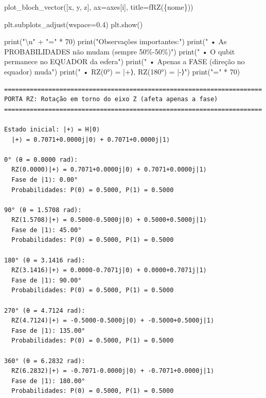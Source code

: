 \documentclass[
  brazilian,
]{report}
\newenvironment{Shaded}{\begin{snugshade}}{\end{snugshade}}
\newcommand{\BuiltInTok}[1]{\textcolor[rgb]{0.00,0.23,0.31}{#1}}
\newcommand{\CharTok}[1]{\textcolor[rgb]{0.13,0.47,0.30}{#1}}
\newcommand{\DecValTok}[1]{\textcolor[rgb]{0.68,0.00,0.00}{#1}}
\newcommand{\FloatTok}[1]{\textcolor[rgb]{0.68,0.00,0.00}{#1}}
\newcommand{\NormalTok}[1]{\textcolor[rgb]{0.00,0.23,0.31}{#1}}
\newcommand{\OperatorTok}[1]{\textcolor[rgb]{0.37,0.37,0.37}{#1}}
\newcommand{\SpecialCharTok}[1]{\textcolor[rgb]{0.37,0.37,0.37}{#1}}
\newcommand{\SpecialStringTok}[1]{\textcolor[rgb]{0.13,0.47,0.30}{#1}}
\newcommand{\StringTok}[1]{\textcolor[rgb]{0.13,0.47,0.30}{#1}}
\begin{document}
\begin{tcolorbox}
\begin{Shaded}
\begin{Highlighting}[]
\NormalTok{    plot\_bloch\_vector([x, y, z], ax}\OperatorTok{=}\NormalTok{axes[i], title}\OperatorTok{=}\SpecialStringTok{f\textquotesingle{}RZ(}\SpecialCharTok{\{}\NormalTok{nome}\SpecialCharTok{\}}\SpecialStringTok{)\textquotesingle{}}\NormalTok{)}

\NormalTok{plt.subplots\_adjust(wspace}\OperatorTok{=}\FloatTok{0.4}\NormalTok{)}
\NormalTok{plt.show()}

\BuiltInTok{print}\NormalTok{(}\StringTok{"}\CharTok{\textbackslash{}n}\StringTok{"} \OperatorTok{+} \StringTok{"="} \OperatorTok{*} \DecValTok{70}\NormalTok{)}
\BuiltInTok{print}\NormalTok{(}\StringTok{"Observações importantes:"}\NormalTok{)}
\BuiltInTok{print}\NormalTok{(}\StringTok{"  • As PROBABILIDADES não mudam (sempre 50}\SpecialCharTok{\%{-}50\%}\StringTok{)"}\NormalTok{)}
\BuiltInTok{print}\NormalTok{(}\StringTok{"  • O qubit permanece no EQUADOR da esfera"}\NormalTok{)}
\BuiltInTok{print}\NormalTok{(}\StringTok{"  • Apenas a FASE (direção no equador) muda"}\NormalTok{)}
\BuiltInTok{print}\NormalTok{(}\StringTok{"  • RZ(0°) = |+⟩, RZ(180°) = |{-}⟩"}\NormalTok{)}
\BuiltInTok{print}\NormalTok{(}\StringTok{"="} \OperatorTok{*} \DecValTok{70}\NormalTok{)}
\end{Highlighting}
\end{Shaded}

\end{tcolorbox}

\begin{verbatim}
======================================================================
PORTA RZ: Rotação em torno do eixo Z (afeta apenas a fase)
======================================================================

Estado inicial: |+⟩ = H|0⟩
  |+⟩ = 0.7071+0.0000j|0⟩ + 0.7071+0.0000j|1⟩

0° (θ = 0.0000 rad):
  RZ(0.0000)|+⟩ = 0.7071+0.0000j|0⟩ + 0.7071+0.0000j|1⟩
  Fase de |1⟩: 0.00°
  Probabilidades: P(0) = 0.5000, P(1) = 0.5000

90° (θ = 1.5708 rad):
  RZ(1.5708)|+⟩ = 0.5000-0.5000j|0⟩ + 0.5000+0.5000j|1⟩
  Fase de |1⟩: 45.00°
  Probabilidades: P(0) = 0.5000, P(1) = 0.5000

180° (θ = 3.1416 rad):
  RZ(3.1416)|+⟩ = 0.0000-0.7071j|0⟩ + 0.0000+0.7071j|1⟩
  Fase de |1⟩: 90.00°
  Probabilidades: P(0) = 0.5000, P(1) = 0.5000

270° (θ = 4.7124 rad):
  RZ(4.7124)|+⟩ = -0.5000-0.5000j|0⟩ + -0.5000+0.5000j|1⟩
  Fase de |1⟩: 135.00°
  Probabilidades: P(0) = 0.5000, P(1) = 0.5000

360° (θ = 6.2832 rad):
  RZ(6.2832)|+⟩ = -0.7071-0.0000j|0⟩ + -0.7071+0.0000j|1⟩
  Fase de |1⟩: 180.00°
  Probabilidades: P(0) = 0.5000, P(1) = 0.5000
\end{verbatim}
\end{document}
